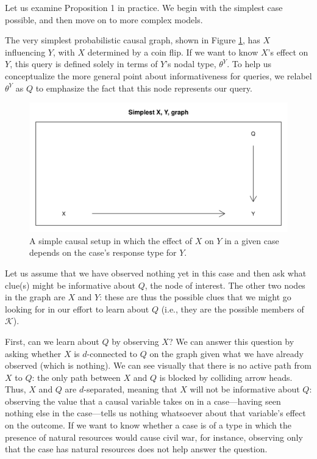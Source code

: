 \documentclass[
  12pt,
]{book}
\begin{document}
Let us examine Proposition 1 in practice. We begin with the simplest case possible, and then move on to more complex models.

The very simplest probabilistic causal graph, shown in Figure \ref{fig:sepsimple}, has \(X\) influencing \(Y\), with \(X\) determined by a coin flip. If we want to know \(X\)'s effect on \(Y\), this query is defined solely in terms of \(Y\)'s nodal type, \(\theta^Y\). To help us conceptualize the more general point about informativeness for queries, we relabel \(\theta^Y\) as \(Q\) to emphasize the fact that this node represents our query.

\begin{figure}

{\centering \includegraphics[width=.5\textwidth]{ii_files/figure-latex/sepsimple-1} 

}

\caption{A simple causal setup in which the effect of $X$ on $Y$ in a given case depends on the case's response type for $Y$.}\label{fig:sepsimple}
\end{figure}

Let us assume that we have observed nothing yet in this case and then ask what clue(s) might be informative about \(Q\), the node of interest. The other two nodes in the graph are \(X\) and \(Y\): these are thus the possible clues that we might go looking for in our effort to learn about \(Q\) (i.e., they are the possible members of \(\mathcal K\)).

First, can we learn about \(Q\) by observing \(X\)? We can answer this question by asking whether \(X\) is \(d\)-connected to \(Q\) on the graph given what we have already observed (which is nothing). We can see visually that there is no active path from \(X\) to \(Q\): the only path between \(X\) and \(Q\) is blocked by colliding arrow heads. Thus, \(X\) and \(Q\) are \(d\)-separated, meaning that \(X\) will not be informative about \(Q\): observing the value that a causal variable takes on in a case---having seen nothing else in the case---tells us nothing whatsoever about that variable's effect on the outcome. If we want to know whether a case is of a type in which the presence of natural resources would cause civil war, for instance, observing only that the case has natural resources does not help answer the question.
\end{document}
